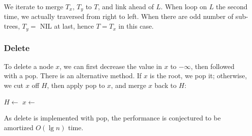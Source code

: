 \documentclass[b5paper]{article}
\begin{document}
We iterate to merge $T_x$, $T_y$ to $T$, and link ahead of $L$. When loop on $L$ the second time, we actually traversed from right to left. When there are odd number of sub-trees, $T_y = $ NIL at last, hence $T = T_x$ in this case.

\subsubsection{Delete}

To delete a node $x$, we can first decrease the value in $x$ to $-\infty$, then followed with a pop. There is an alternative method. If $x$ is the root, we pop it; otherwise, we cut $x$ off $H$, then apply pop to $x$, and merge $x$ back to $H$:

\begin{algorithmic}[1]
    \State {}
  \Else
    \State $H \gets$ 
    \State $x \gets$ 
    \State {}
  \EndIf
\EndFunction
\end{algorithmic}

As delete is implemented with pop, the performance is conjectured to be amortized $O(\lg n)$ time.

\begin{Exercise}\label{ex:pairing-heap-del}
\end{Exercise}
\end{document}
